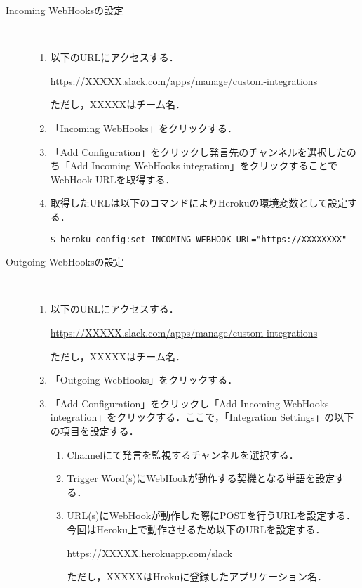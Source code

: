 \documentclass[fleqn, 14pt]{extarticlej}
\begin{document}
\begin{description}
\item[Incoming WebHooksの設定]\
  
  \begin{enumerate}
  \item 以下のURLにアクセスする．
    
    \url{https://XXXXX.slack.com/apps/manage/custom-integrations}

    ただし，XXXXXはチーム名．
    
  \item 「Incoming WebHooks」をクリックする．
  \item 「Add Configuration」をクリックし発言先のチャンネルを選択したのち「Add Incoming WebHooks integration」をクリックすることでWebHook URLを取得する．
  \item 取得したURLは以下のコマンドによりHerokuの環境変数として設定する．

    \verb|$ heroku config:set INCOMING_WEBHOOK_URL="https://XXXXXXXX"| 
  \end{enumerate}
\item[Outgoing WebHooksの設定]\
  
  \begin{enumerate}
  \item 以下のURLにアクセスする．
    
    \url{https://XXXXX.slack.com/apps/manage/custom-integrations}

    ただし，XXXXXはチーム名．
    
  \item 「Outgoing WebHooks」をクリックする．
  \item 「Add Configuration」をクリックし「Add Incoming WebHooks integration」をクリックする．ここで，「Integration Settings」の以下の項目を設定する．
    \begin{enumerate}
    \item Channelにて発言を監視するチャンネルを選択する．
    \item Trigger Word(s)にWebHookが動作する契機となる単語を設定する．
    \item URL(s)にWebHookが動作した際にPOSTを行うURLを設定する．今回はHeroku上で動作させるため以下のURLを設定する．

      \url{https://XXXXX.herokuapp.com/slack}
      
      ただし，XXXXXはHrokuに登録したアプリケーション名．
    \end{enumerate}
  \end{enumerate}
\end{description}
\end{document}
